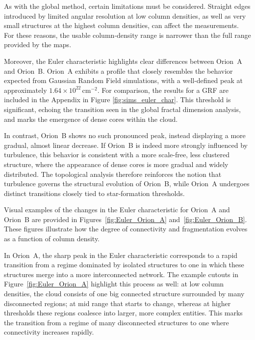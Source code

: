 As with the global method, certain limitations must be considered.  
Straight edges introduced by limited angular resolution at low column densities, as well as very small structures at the highest column densities, can affect the measurements.  
For these reasons, the usable column‑density range is narrower than the full range provided by the maps.

Moreover, the Euler characteristic highlights clear differences between Orion~A and Orion~B.  
Orion~A exhibits a profile that closely resembles the behavior expected from Gaussian Random Field simulations, with a well-defined peak at approximately \(1.64 \times 10^{22}\,\mathrm{cm}^{-2}\). For comparison, the results for a GRF are included in the Appendix in Figure \ref{fig:sims_euler_char}. 
This threshold is significant, echoing the transition seen in the global fractal dimension analysis, and marks the emergence of dense cores within the cloud.

In contrast, Orion~B shows no such pronounced peak, instead displaying a more gradual, almost linear decrease.  
If Orion~B is indeed more strongly influenced by turbulence, this behavior is consistent with a more scale-free, less clustered structure, where the appearance of dense cores is more gradual and widely distributed.  
The topological analysis therefore reinforces the notion that turbulence governs the structural evolution of Orion~B, while Orion~A undergoes distinct transitions closely tied to star-formation thresholds.

Visual examples of the changes in the Euler characteristic for Orion~A and Orion~B are provided in Figures~\ref{fig:Euler_Orion_A} and~\ref{fig:Euler_Orion_B}.  
These figures illustrate how the degree of connectivity and fragmentation evolves as a function of column density.  

In Orion~A, the sharp peak in the Euler characteristic corresponds to a rapid transition from a regime dominated by isolated structures to one in which these structures merge into a more interconnected network.  
The example cutouts in Figure~\ref{fig:Euler_Orion_A} highlight this process as well: at low column densities, the cloud consists of one big connected structure surrounded by many disconnected regions; at mid range that starts to change, whereas at higher thresholds these regions coalesce into larger, more complex entities.
This marks the transition from a regime of many disconnected structures to one where connectivity increases rapidly.


